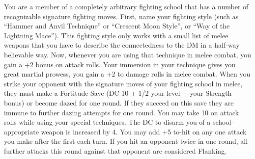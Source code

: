 \combatfeat
{You are a member of a completely arbitrary fighting school that has a number of recognizable signature fighting moves.}
{First, name your fighting style (such as ``Hammer and Anvil Technique'' or ``Crescent Moon Style'', or ``Way of the Lightning Mace''). This fighting style only works with a small list of melee weapons that you have to describe the connectedness to the DM in a half-way believable way. Now, whenever you are using that technique in melee combat, you gain a +2 bonus on attack rolls.}
{Your immersion in your technique gives you great martial prowess, you gain a +2 to damage rolls in melee combat.}
{When you strike your opponent with the signature moves of your fighting school in melee, they must make a Fortitude Save (DC 10 + 1/2 your level + your Strength bonus) or become dazed for one round. If they succeed on this save they are immune to further dazing attempts for one round.}
{You may take 10 on attack rolls while using your special techniques. The DC to disarm you of a school-appropriate weapon is increased by 4.}
{You may add +5 to-hit on any one attack you make after the first each turn. If you hit an opponent twice in one round, all further attacks this round against that opponent are considered Flanking.}